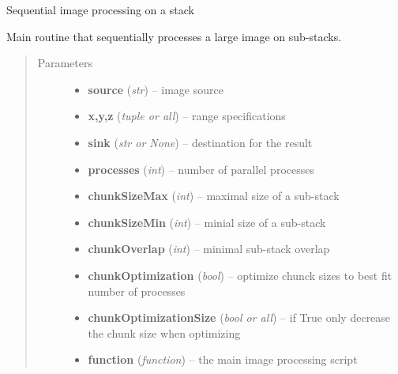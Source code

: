 \documentclass[letterpaper,10pt,english]{sphinxmanual}
\begin{document}
\begin{fulllineitems}
\label{api/ClearMap.ImageProcessing:ClearMap.ImageProcessing.StackProcessing.sequentiallyProcessStack}
Sequential image processing on a stack

Main routine that sequentially processes a large image on sub-stacks.
\begin{quote}\begin{description}
\item[{Parameters}] \leavevmode\begin{itemize}
\item {} 
\textbf{source} (\emph{str}) --
image source

\item {} 
\textbf{x,y,z} (\emph{tuple or all}) --
range specifications

\item {} 
\textbf{sink} (\emph{str or None}) --
destination for the result

\item {} 
\textbf{processes} (\emph{int}) --
number of parallel processes

\item {} 
\textbf{chunkSizeMax} (\emph{int}) --
maximal size of a sub-stack

\item {} 
\textbf{chunkSizeMin} (\emph{int}) --
minial size of a sub-stack

\item {} 
\textbf{chunkOverlap} (\emph{int}) --
minimal sub-stack overlap

\item {} 
\textbf{chunkOptimization} (\emph{bool}) --
optimize chunck sizes to best fit number of processes

\item {} 
\textbf{chunkOptimizationSize} (\emph{bool or all}) --
if True only decrease the chunk size when optimizing

\item {} 
\textbf{function} (\emph{function}) --
the main image processing script


\end{itemize}
\end{description}
\end{quote}
\end{fulllineitems}
\end{document}
